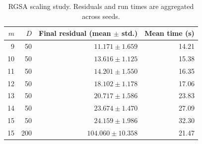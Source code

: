 \begin{table}[htbp]
\centering
\caption{RGSA scaling study. Residuals and run times are aggregated across seeds.}
\label{tab:rgsa-scaling}
\begin{tabular}{rrrr}
\toprule
$m$ & $D$ & Final residual (mean $\pm$ std.) & Mean time (s) \\
\midrule
9 & 50 & $11.171 \pm 1.659$ & 14.21 \\
10 & 50 & $13.616 \pm 1.125$ & 15.38 \\
11 & 50 & $14.201 \pm 1.550$ & 16.35 \\
12 & 50 & $18.102 \pm 1.178$ & 17.06 \\
13 & 50 & $20.717 \pm 1.586$ & 23.83 \\
14 & 50 & $23.674 \pm 1.470$ & 27.09 \\
15 & 50 & $24.159 \pm 1.986$ & 32.30 \\
15 & 200 & $104.060 \pm 10.358$ & 21.47 \\
\bottomrule
\end{tabular}
\end{table}
